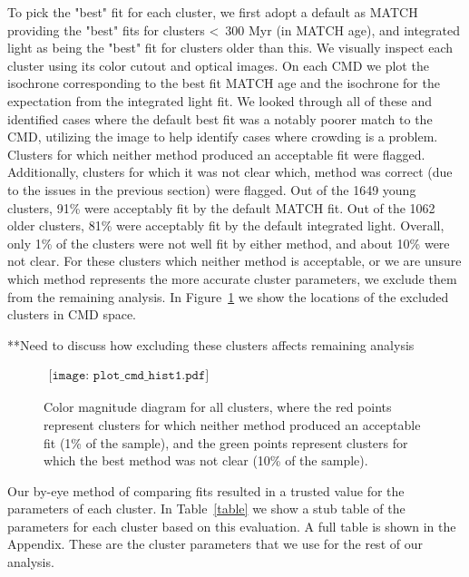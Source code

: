 \documentclass{emulateapj}
\begin{document}
To pick the "best" fit for each cluster, we first adopt a default as MATCH providing the "best" fits for clusters \textless\ 300 Myr (in MATCH age), and integrated light as being the "best" fit for clusters older than this.  We visually inspect each cluster using its color cutout and optical images.  On each CMD we plot the isochrone corresponding to the best fit MATCH age and the isochrone for the expectation from the integrated light fit.  We looked through all of these and identified cases where the default best fit was a notably poorer match to the CMD, utilizing the image to help identify cases where crowding is a problem.  Clusters for which neither method produced an acceptable fit were flagged.  Additionally, clusters for which it was not clear which, method was correct (due to the issues in the previous section) were flagged.  Out of the 1649 young clusters, 91\% were acceptably fit by the default MATCH fit.  Out of the 1062 older clusters, 81\% were acceptably fit by the default integrated light.  Overall, only 1\% of the clusters were not well fit by either method, and about 10\% were not clear.  For these clusters which neither method is acceptable, or we are unsure which method represents the more accurate cluster parameters, we exclude them from the remaining analysis.  In Figure~\ref{fig:cmd_hist} we show the locations of the excluded clusters in CMD space.

**Need to discuss how excluding these clusters affects remaining analysis


\begin{figure}[!ht]
   \begin{center}$
      \begin{array}{cc}
         \texttt{[image: plot\_cmd\_hist1.pdf]} 
      \end{array}$
   \end{center}
  \caption{Color magnitude diagram for all clusters, where the red points represent clusters for which neither method produced an acceptable fit (1\% of the sample), and the green points represent clusters for which the best method was not clear (10\% of the sample).}
  \label{fig:cmd_hist}
\end{figure}


Our by-eye method of comparing fits resulted in a trusted value for the parameters of each cluster.  In Table~\ref{table} we show a stub table of the parameters for each cluster based on this evaluation.  A full table is shown in the Appendix.  These are the cluster parameters that we use for the rest of our analysis.
\end{document}
